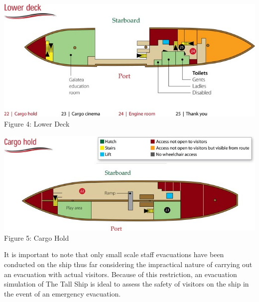 \documentclass[a4paper,10pt]{article}
\begin{document}
\begin{center}
\includegraphics[scale=0.4]{lowerdeck.jpg}
\\Figure 4: Lower Deck
\end{center}

\begin{center}
\includegraphics[scale=0.4]{cargohold.jpg}
\\Figure 5: Cargo Hold
\end{center}

It is important to note that only small scale staff evacuations have been conducted on the ship
thus far considering the impractical nature of carrying out an evacuation with
actual visitors. Because of this restriction, an evacuation simulation of The
Tall Ship is ideal to assess the safety of visitors on the ship in the event of an
emergency evacuation.


\end{document}
